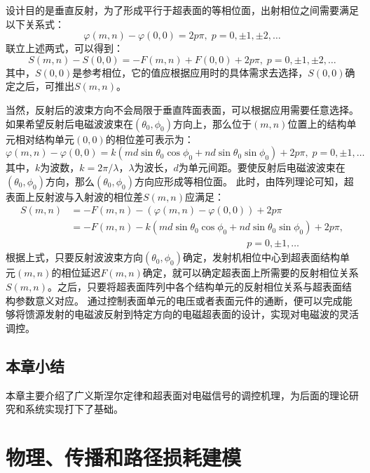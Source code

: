 \documentclass[supercite]{HustGraduPaper}
\begin{document}
设计目的是垂直反射，为了形成平行于超表面的等相位面，出射相位之间需要满足以下关系式：
\begin{equation}
	\varphi (m,n) - \varphi (0,0) = 2p \pi, \; p = 0, \pm 1,\pm 2,\dots 
\end{equation}
联立上述两式，可以得到：
\begin{equation}
	S(m,n)-S(0,0)=-F(m,n)+F(0,0)+2p\pi, \; p = 0, \pm 1,\pm 2,\dots 
\end{equation}
其中，$S(0,0)$是参考相位，它的值应根据应用时的具体需求去选择，$S(0,0)$确定之后，可推出$S(m,n)$。

当然，反射后的波束方向不会局限于垂直阵面表面，可以根据应用需要任意选择。
如果希望反射后电磁波波束在$(\theta_0,\phi_0)$方向上，那么位于$(m,n)$位置上的结构单元相对结构单元$(0,0)$的相位差可表示为：
\begin{equation}
	\varphi(m,n)-\varphi(0,0)=k(md\sin⁡\theta_0 \cos⁡\phi_0+nd\sin⁡\theta_0 \sin\phi_0)+2p\pi,\;p = 0, \pm 1,\dots 
\end{equation}
其中，$k$为波数，$k=2\pi/ \lambda$，$\lambda$为波长，$d$为单元间距。要使反射后电磁波波束在$(\theta_0,\phi_0)$方向，那么$(\theta_0,\phi_0)$方向应形成等相位面。
此时，由阵列理论可知，超表面上反射波与入射波的相位差$S(m,n)$应满足：
\begin{equation}
	\begin{aligned}
		S(m,n)&=-F(m,n)-(\varphi(m,n)-\varphi(0,0))+2p\pi \\
	          &=-F(m,n)-k(md\sin⁡\theta_0 \cos⁡\phi_0+nd\sin⁡\theta_0 \sin\phi_0)+2p\pi ,\\
			  &\qquad \qquad \qquad \qquad \qquad \qquad \qquad \qquad \qquad p = 0, \pm 1,\dots 
	\end{aligned}
\end{equation}
根据上式，只要反射波波束方向$(\theta_0,\phi_0)$确定，发射机相位中心到超表面结构单元$(m,n)$的相位延迟$F(m,n)$确定，就可以确定超表面上所需要的反射相位关系$S(m,n)$。之后，只要将超表面阵列中各个结构单元的反射相位关系与超表面结构参数意义对应。
通过控制表面单元的电压或者表面元件的通断，便可以完成能够将馈源发射的电磁波反射到特定方向的电磁超表面的设计，实现对电磁波的灵活调控。

\subsection{本章小结}

本章主要介绍了广义斯涅尔定律和超表面对电磁信号的调控机理，为后面的理论研究和系统实现打下了基础。

\section{物理、传播和路径损耗建模}\label{sec:modeling}
\end{document}
